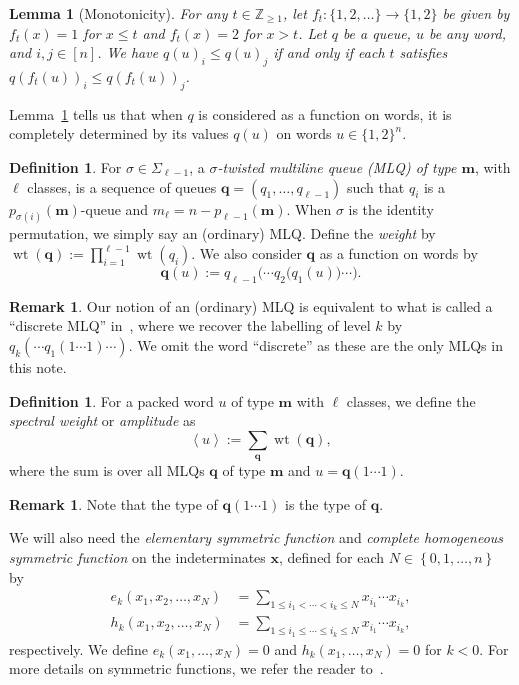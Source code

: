 \documentclass[reqno]{amsart}
\newcommand{\0}{\phantom{c}}
\newcommand{\swt}[1]{\left\langle #1 \right\rangle} %
\newcommand{\SymGp}[1]{\Sigma_{#1}} %
\DeclareMathOperator{\wt}{wt} %
\newcommand{\xx}{\mathbf{x}}
\newcommand{\mm}{\mathbf{m}}
\newcommand{\qq}{\mathbf{q}}
\newcommand{\ZZ}{\mathbb{Z}}
\let\sumnonlimits\sum
\let\prodnonlimits\prod
\renewcommand{\sum}{\sumnonlimits\limits}
\renewcommand{\prod}{\prodnonlimits\limits}
\newcommand{\ive}[1]{\left[ #1 \right]}
\newcommand{\defn}[1]{{\color{darkred}\emph{#1}}} %
\theoremstyle{plain}
\newtheorem{lemma}[thm]{Lemma}
\theoremstyle{definition}
\newtheorem{dfn}[thm]{Definition}
\newtheorem{remark}[thm]{Remark}
\numberwithin{equation}{section}
\begin{document}
\begin{lemma}[Monotonicity]
\label{le:mono}
  For any $t \in \ZZ_{\geq 1}$, let $f_t \colon \{1,2, \ldots\} \to \{1,2\}$ be given by $f_t(x) = 1$ for $x \leq t$ and $f_t(x) = 2$ for $x > t$.
  Let $q$ be a queue, $u$ be any word, and $i,j \in \ive{n}$.
  We have $q(u)_i \leq q(u)_j$ if and only if each $t$ satisfies $q(f_t(u))_i \leq q(f_t(u))_j$.
\end{lemma}

Lemma~\ref{le:mono} tells us that when $q$ is considered as a function on words, it is completely determined by its values $q(u)$ on words $u \in \{1,2\}^n$.

\begin{dfn}
For $\sigma \in \SymGp{\ell-1}$, a \defn{$\sigma$-twisted multiline queue (MLQ) of type $\mm$}, with $\ell$ classes, is a sequence of queues $\qq = (q_1, \dotsc, q_{\ell-1})$ such that $q_i$ is a $p_{\sigma(i)}(\mm)$-queue and $m_{\ell} = n - p_{\ell-1}(\mm)$.
When $\sigma$ is the identity permutation, we simply say an (ordinary) MLQ.
Define the \defn{weight} by $\wt(\qq) := \prod_{i=1}^{\ell-1} \wt(q_i)$.
We also consider $\qq$ as a function on words by
\[
\qq(u) := q_{\ell-1}\bigl( \cdots q_2\bigl( q_1(u) \bigr) \cdots \bigr).
\]
\end{dfn}

\begin{remark}
Our notion of an (ordinary) MLQ is equivalent to what is called a ``discrete MLQ'' in~\cite[\S 2.2]{AasLin17}, where we recover the labelling of level $k$ by $q_k( \cdots q_1(1 \dotsm 1) \cdots )$.
We omit the word ``discrete'' as these are the only MLQs in this note.
\end{remark}

\begin{dfn}
For a packed word $u$ of type $\mm$ with $\ell$ classes, we define the \defn{spectral weight} or \defn{amplitude} as
\begin{equation}
\label{eq:amplitude}
  \swt{u} := \sum_{\qq} \wt(\qq),
\end{equation}
where the sum is over all MLQs $\qq$ of type $\mm$ and $u = \qq(1 \dotsm 1)$.
\end{dfn}

\begin{remark}
Note that the type of $\qq(1 \dotsm 1)$ is the type of $\qq$.
\end{remark}

We will also need the \defn{elementary symmetric function} and \defn{complete homogeneous symmetric function} on the indeterminates $\xx$,
defined for each $N \in \left\{0,1,\ldots,n\right\}$ by
\begin{align*}
e_k(x_1, x_2, \dotsc, x_N) & = \sum_{1 \leq i_1 < \cdots < i_k \leq N} x_{i_1} \dotsm x_{i_k},
\\ h_k(x_1, x_2, \dotsc, x_N) & = \sum_{1 \leq i_1 \leq \cdots \leq i_k \leq N} x_{i_1} \dotsm x_{i_k},
\end{align*}
respectively.
We define $e_k(x_1, \dotsc, x_N) = 0$ and $h_k(x_1, \dotsc, x_N) = 0$ for $k < 0$.
For more details on symmetric functions, we refer the reader to~\cite[Ch.~7]{Stanley-EC2}.
\end{document}

